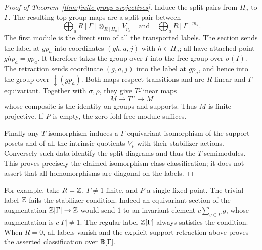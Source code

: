\begin{proof}[Proof of Theorem~\ref{thm:finite-group-projectives}]
Induce the split pairs from $H_a$ to $\Gamma$. The resulting top group
maps are a split pair between
\[
 \bigoplus_a R[\Gamma]\otimes_{R[H_a]}V_{p_a}
 \quad\text{and}\quad
 \bigoplus_a R[\Gamma]^{m_a}.
\]
The first module is the direct sum of all the transported labels.
The section sends the label at $gp_a$ into coordinates $(gh,a,j)$
with $h\in H_a$; all have attached point $ghp_a=gp_a$.
It therefore takes the group over $I$ into the free group over
$\sigma(I)$. The retraction sends coordinate $(g,a,j)$ into the label
at $gp_a$, and hence into the group over $\downarrow(gp_a)$.
Both maps respect transitions and are $R$-linear and
$\Gamma$-equivariant. Together with $\sigma,\rho$, they give
$T$-linear maps
\[
 M\longrightarrow T^n\longrightarrow M
\]
whose composite is the identity on groups and supports. Thus $M$ is
finite projective. If $P$ is empty, the zero-fold free module suffices.

Finally any $T$-isomorphism induces a $\Gamma$-equivariant isomorphism
of the support posets and of all the intrinsic quotients $V_p$ with
their stabilizer actions. Conversely such data identify the split
diagrams and thus the $T$-semimodules. This proves precisely the
claimed isomorphism-class classification; it does not assert that
all homomorphisms are diagonal on the labels.
\end{proof}

For example, take $R=\mathbb Z$, $\Gamma\ne1$ finite, and $P$ a single
fixed point. The trivial label $\mathbb Z$ fails the stabilizer condition.
Indeed an equivariant section of the augmentation
$\mathbb Z[\Gamma]\to\mathbb Z$ would send $1$ to an invariant element
$c\sum_{g\in\Gamma}g$, whose augmentation is $c|\Gamma|\ne1$.
The regular label $\mathbb Z[\Gamma]$ always satisfies the condition.
When $R=0$, all labels vanish and the explicit support retraction
above proves the asserted classification over $\mathbb B[\Gamma]$.


